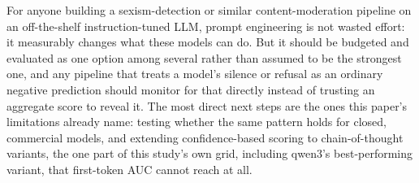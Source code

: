 For anyone building a sexism-detection or similar content-moderation
pipeline on an off-the-shelf instruction-tuned LLM, prompt engineering
is not wasted effort: it measurably changes what these models can do.
But it should be budgeted and evaluated as one option among several
rather than assumed to be the strongest one, and any pipeline that
treats a model's silence or refusal as an ordinary negative prediction
should monitor for that directly instead of trusting an aggregate score
to reveal it. The most
direct next steps are the ones this paper's limitations already name:
testing whether the same pattern holds for closed, commercial models,
and extending confidence-based scoring to chain-of-thought variants,
the one part of this study's own grid, including qwen3's best-performing
variant, that first-token AUC cannot reach at all.
